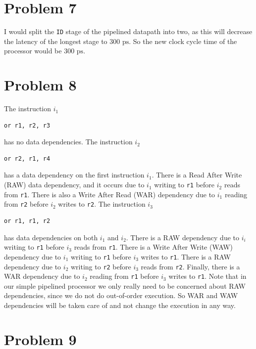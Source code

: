 \documentclass[12pt]{article}
\begin{document}
\section*{Problem 7}

I would split the \texttt{ID} stage of the pipelined datapath into two, as this will decrease the latency of the longest stage to \(300\text{ ps}\). So
the new clock cycle time of the processor would be \(300\text{ ps}\).

\section*{Problem 8}

The instruction \(i_1\)
\begin{verbatim}
or r1, r2, r3
\end{verbatim}
has no data dependencies. The instruction \(i_2\)
\begin{verbatim}
or r2, r1, r4
\end{verbatim}
has a data dependency on the first instruction \(i_1\). There is a Read After Write (RAW) data dependency, and it occurs due to \(i_1\) writing to
\texttt{r1} before \(i_2\) reads from \texttt{r1}. There is also a Write After Read (WAR) dependency due to \(i_1\) reading from \texttt{r2} before
\(i_2\) writes to \texttt{r2}.
The instruction \(i_3\)
\begin{verbatim}
or r1, r1, r2
\end{verbatim}
has data dependencies on both \(i_1\) and \(i_2\). There is a RAW dependency due to \(i_i\) writing to \texttt{r1} before \(i_3\) reads from \texttt{r1}.
There is a Write After Write (WAW) dependency due to \(i_1\) writing to \texttt{r1} before \(i_3\) writes to \texttt{r1}. There is a RAW dependency due to
\(i_2\) writing to \texttt{r2} before \(i_3\) reads from \texttt{r2}. Finally, there is a WAR dependency due to \(i_2\) reading from \texttt{r1} before \(i_3\)
writes to \texttt{r1}. Note that in our simple pipelined processor we only really need to be concerned about RAW dependencies, since we do not do out-of-order
execution. So WAR and WAW dependencies will be taken care of and not change the execution in any way.

\section*{Problem 9}
\end{document}
